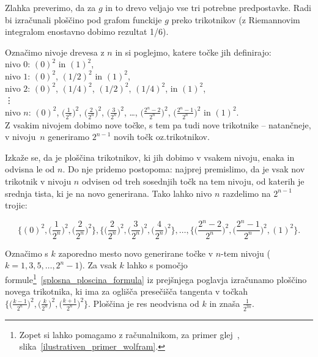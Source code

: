 \documentclass[a4paper, 12pt, titlepage]{article}
\begin{document}
Zlahka preverimo, da za $ g $ in to drevo veljajo vse tri potrebne predpostavke. Radi bi izračunali ploščino pod grafom funckije $ g $ preko trikotnikov (z Riemannovim integralom enostavno dobimo rezultat 1/6).

Označimo nivoje drevesa z $ n $ in si poglejmo, katere točke jih definirajo: \\

\noindent nivo $ 0 $: $ (0)^2 $ in $ (1)^2 $, \\
nivo $ 1 $: $ (0)^2 $, $ (1/2)^2 $ in $ (1)^2 $, \\
nivo $ 2 $:  $ (0)^2 $, $ (1/4)^2 $, $ (1/2)^2 $, $ (1/4)^2 $, in $ (1)^2 $, \\
\indent \vdots \\
nivo $ n $: $ (0)^2 $, $ \bigl(\frac{1}{2^n}\bigr)^2 $, $ \bigl(\frac{2}{2^n}\bigr)^2 $, $ \bigl(\frac{3}{2^n}\bigr)^2 $, \ldots, $ \bigl(\frac{2^n-2}{2^n}\bigr)^2 $, $ \bigl(\frac{2^n-1}{2^n}\bigr)^2 $ in $ (1)^2 $. \\

Z vsakim nivojem dobimo nove točke, s tem pa tudi nove trikotnike -- natančneje, v nivoju~$n$ generiramo $ 2^{n-1} $ novih točk oz.trikotnikov.

Izkaže se, da je ploščina trikotnikov, ki jih dobimo v vsakem nivoju, enaka in odvisna le od $ n $. Do nje pridemo postopoma: najprej premislimo, da je vsak nov trikotnik v nivoju $ n $ odvisen od treh sosednjih točk na tem nivoju, od katerih je srednja tista, ki je na novo generirana. Tako lahko nivo $ n $ razdelimo na $ 2^{n-1} $ trojic:

$$
\biggl\{(0)^2, \bigl(\frac{1}{2^n}\bigr)^2,\bigl(\frac{2}{2^n}\bigr)^2\biggr\} , \biggl\{\bigl(\frac{2}{2^n}\bigr)^2, \bigl(\frac{3}{2^n}\bigr)^2, \bigl(\frac{4}{2^n}\bigr)^2\biggr\}, \ldots, \biggl\{\bigl(\frac{2^n-2}{2^n}\bigr)^2, \bigl(\frac{2^n-1}{2^n}\bigr)^2, (1)^2\biggr\}.
$$

\noindent Označimo s $ k $ zaporedno mesto novo generirane točke v $ n $-tem nivoju ($ k = 1, 3, 5, \ldots, 2^n-1 $). Za vsak $ k $ lahko s pomočjo formule\footnote{Zopet si lahko pomagamo z računalnikom, za primer glej~, slika~\ref{ilustrativen_primer_wolfram}.}~\eqref{splosna_ploscina_formula} iz prejšnjega poglavja izračunamo ploščino novega trikotnika, ki ima za oglišča presečišča tangenta v točkah $ \bigl\{\bigl(\frac{k-1}{2^n}\bigr)^2, \bigl(\frac{k}{2^n}\bigr)^2, \bigl(\frac{k+1}{2^n}\bigr)^2\bigr\} $. Ploščina je res neodvisna od $ k $ in znaša $ \frac{1}{2^{3n}} $.
\end{document}

